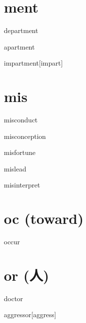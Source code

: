 \section{ment}

\begin{RefWord}{department}
\end{RefWord}

\begin{RefWord}{apartment}
\end{RefWord}

\begin{RefWord}{impartment}[impart]
\end{RefWord}

\section{mis}

\begin{RefWord}{misconduct}
\end{RefWord}

\begin{RefWord}{misconception}
\end{RefWord}

\begin{RefWord}{misfortune}
\end{RefWord}

\begin{RefWord}{mislead}
\end{RefWord}

\begin{RefWord}{misinterpret}
\end{RefWord}

\section{oc (toward)}

\begin{RefWord}{occur}
\end{RefWord}

\section{or (人)}


\begin{RefWord}{doctor}
\end{RefWord}

\begin{RefWord}{aggressor}[aggress]
\end{RefWord}


